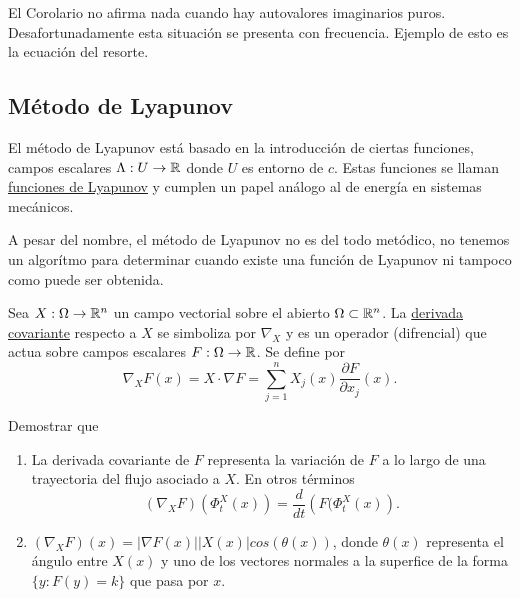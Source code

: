  El Corolario no afirma nada cuando hay autovalores imaginarios puros. Desafortunadamente esta situación se presenta con frecuencia.
Ejemplo de esto es la ecuación del resorte.
 


\subsection{Método de Lyapunov}

El método de Lyapunov está basado en la introducción de ciertas funciones, campos escalares 
 $\Lambda:U\to \mathbb{R}$ donde $U$ es entorno de $c$. Estas funciones se llaman \href{http://es.wikipedia.org/wiki/Función_de_Lyapunov}{funciones de Lyapunov} y
 cumplen un papel análogo al de energía en sistemas mecánicos.
 
 A pesar del nombre, el método de Lyapunov no es del todo metódico, no tenemos un algorítmo para determinar 
 cuando existe una función de Lyapunov ni tampoco como puede ser obtenida.


\begin{definicion}{}
               Sea $X:\Omega\to\mathbb{R}^n$ un campo vectorial sobre el abierto $\Omega\subset\mathbb{R}^n$. La 
               \href{http://es.wikipedia.org/wiki/Derivada_covariante}{derivada covariante} respecto a $X$
               se simboliza por $\nabla_X$ y es un operador (difrencial) que actua sobre campos escalares 
               $F:\Omega\to\mathbb{R}$. Se define por
               \[
               \nabla_XF(x)=X\cdot\nabla F=\sum_{j=1}^nX_j(x) \frac{\partial F}{\partial x_j}(x).
                \]

\end{definicion}




\begin{ejercicio}{} Demostrar que
  \begin{enumerate}
    \item La derivada covariante de $F$ representa la variación de $F$ a lo largo de una 
   trayectoria del flujo asociado a $X$. En otros términos
   \[(\nabla_XF)(\Phi_t^X(x))=\frac{d}{dt}\left(F(\Phi_t^X(x)\right).\]
    \item $(\nabla_XF)(x)=|\nabla F(x)||X(x)|cos(\theta(x))$, donde $\theta(x)$ representa el ángulo entre $X(x)$ 
   y uno de los vectores normales a la superfice de la forma $\{y:F(y)=k\}$ que pasa por $x$.
  \end{enumerate}
\end{ejercicio}


